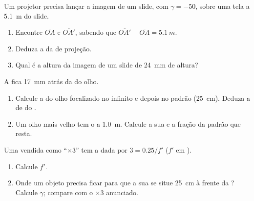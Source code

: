 \begin{exercise}[$\star\star\star$]\label{exo:g11:lenses-and-eye:12}
Um projetor precisa lançar a imagem de um slide, com 
$\gamma = -50$, sobre uma tela a \qty{5.1}{m} do slide.
\begin{enumerate}
  \item Encontre $\overline{OA}$ e $\overline{OA'}$, sabendo que
        $\overline{OA'} - \overline{OA} = \qty{5.1}{m}$.
  \item Deduza a  da  de projeção.
  \item Qual é a altura da imagem de um slide de \qty{24}{mm} de altura?
\end{enumerate}
\end{exercise}

\begin{exercise}[$\star\star\star$]\label{exo:g11:lenses-and-eye:13}
A  fica \qty{17}{mm} atrás da  do olho.
\begin{enumerate}
  \item Calcule a  do olho focalizado no infinito e depois no
         padrão (\qty{25}{cm}). Deduza a  de
         do .
  \item Um olho mais velho tem o  a \qty{1.0}{m}. Calcule a
        sua  e a fração da  padrão que resta.
\end{enumerate}
\end{exercise}

\begin{exercise}[$\star\star\star$]\label{exo:g11:lenses-and-eye:14}
Uma  vendida como ``$\times 3$'' tem a  dada por
$3 = 0.25/f'$ ($f'$ em ).
\begin{enumerate}
  \item Calcule $f'$.
  \item Onde um objeto precisa ficar para que a sua  se
        situe \qty{25}{cm} à frente da ? Calcule $\gamma$; compare
        com o $\times 3$ anunciado.
\end{enumerate}
\end{exercise}

